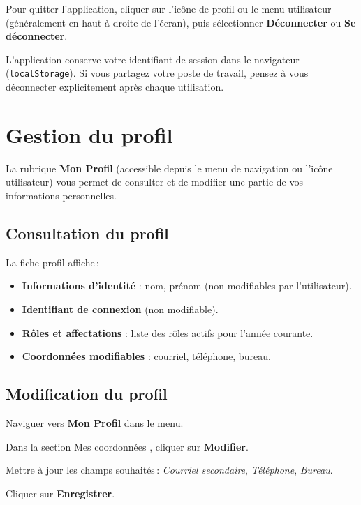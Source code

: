 Pour quitter l'application, cliquer sur l'ic\^one de profil ou le menu utilisateur (g\'en\'eralement en haut \`a droite de l'\'ecran), puis s\'electionner \textbf{D\'econnecter} ou \textbf{Se d\'econnecter}.

\begin{warnbox}
  L'application conserve votre identifiant de session dans le navigateur (\texttt{localStorage}). Si vous partagez votre poste de travail, pensez \`a vous d\'econnecter explicitement apr\`es chaque utilisation.
\end{warnbox}

\section{Gestion du profil}

La rubrique \textbf{Mon Profil} (accessible depuis le menu de navigation ou l'ic\^one utilisateur) vous permet de consulter et de modifier une partie de vos informations personnelles.

\subsection{Consultation du profil}

La fiche profil affiche\,:
\begin{itemize}
  \item \textbf{Informations d'identit\'e} : nom, pr\'enom (non modifiables par l'utilisateur).
  \item \textbf{Identifiant de connexion} (non modifiable).
  \item \textbf{R\^oles et affectations} : liste des r\^oles actifs pour l'ann\'ee courante.
  \item \textbf{Coordonn\'ees modifiables} : courriel, t\'el\'ephone, bureau.
\end{itemize}


\subsection{Modification du profil}

\begin{steps}
  \item Naviguer vers \textbf{Mon Profil} dans le menu.
  \item Dans la section \og Mes coordonn\'ees \fg, cliquer sur \textbf{Modifier}.
  \item Mettre \`a jour les champs souhait\'es\,: \textit{Courriel secondaire}, \textit{T\'el\'ephone}, \textit{Bureau}.
  \item Cliquer sur \textbf{Enregistrer}.
\end{steps}

